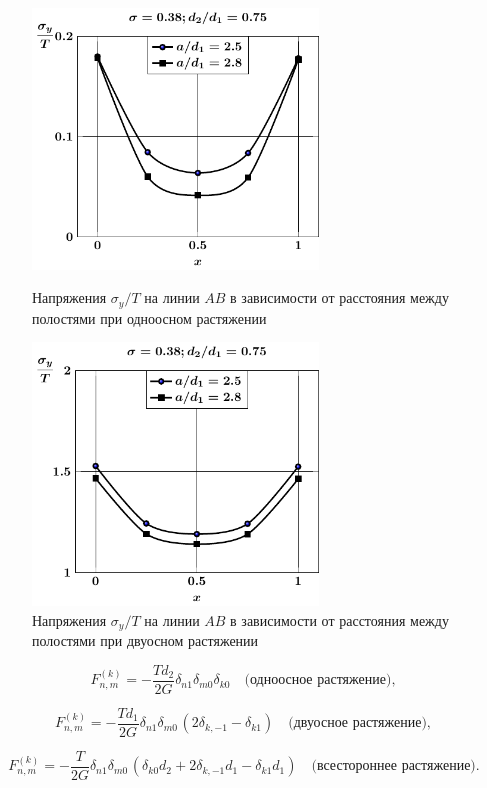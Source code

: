 \begin{russian}
\begin{figure}[h!]
\centering\footnotesize
\parbox[b]{7.5cm}{\centering\includegraphics[width=7.6cm]{periodic-cav27-a-d75-t1-sig_y.pdf}
\caption{Напряжения $\sigma_y/T$ на линии $AB$ в зависимости от расстояния между полостями при одноосном растяжении
\label{f:11:22}}}\hfil\hfil
\parbox[b]{7.5cm}{\centering\includegraphics[width=7.6cm]{periodic-cav27-a-d75-t2-sig_y.pdf}
\caption{Напряжения $\sigma_y/T$ на линии $AB$ в зависимости от расстояния между полостями при двуосном растяжении
\label{f:11:23}}}
\end{figure}

\begin{equation*}
F_{n,m}^{(k)} =  -\frac{Td_2}{2G}{\delta _{n1}}{\delta _{m0}}{\delta _{k0}}\quad\text{(одноосное растяжение)},
\label{eq:11:19}
\end{equation*}

\begin{equation*}
F_{n,m}^{(k)} =  -\frac{Td_1}{2G}{\delta _{n1}}{\delta _{m0\,}}(2{\delta _{k, - 1}} - {\delta _{k1}})\quad\text{(двуосное растяжение)},
\label{eq:11:20}
\end{equation*}

\begin{equation*}
F_{n,m}^{(k)} =  -\frac{T}{2G}{\delta _{n1}}{\delta _{m0\,}}(\delta_{k0}d_2+2{\delta _{k, - 1}}d_1 - {\delta _{k1}}d_1)\quad\text{(всестороннее растяжение)}.
\label{eq:11:21}
\end{equation*}


\end{russian}
